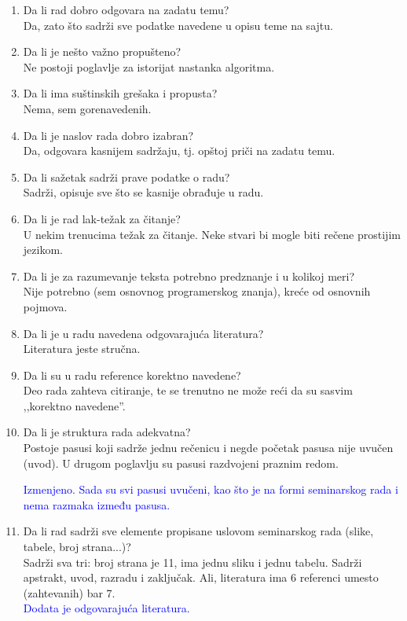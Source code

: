 \documentclass[a4paper]{report}
\newcommand{\odgovor}[1]{\textcolor{blue}{#1}}
\begin{document}
\begin{enumerate}
\item Da li rad dobro odgovara na zadatu temu?\\
Da, zato što sadrži sve podatke navedene u opisu teme na sajtu. 

\item Da li je nešto važno propušteno?\\
Ne postoji poglavlje za istorijat nastanka algoritma.

\item Da li ima suštinskih grešaka i propusta?\\
Nema, sem gorenavedenih.

\item Da li je naslov rada dobro izabran?\\
Da, odgovara kasnijem sadržaju, tj. opštoj priči na zadatu temu. 

\item Da li sažetak sadrži prave podatke o radu?\\
Sadrži, opisuje sve što se kasnije obrađuje u radu.

\item Da li je rad lak-težak za čitanje?\\
U nekim trenucima težak za čitanje. Neke stvari bi mogle biti rečene prostijim jezikom. 

\item Da li je za razumevanje teksta potrebno predznanje i u kolikoj meri?\\
Nije potrebno (sem osnovnog programerskog znanja), kreće od osnovnih pojmova. 

\item Da li je u radu navedena odgovarajuća literatura?\\
Literatura jeste stručna.

\item Da li su u radu reference korektno navedene?\\
Deo rada zahteva citiranje, te se trenutno ne može reći da su sasvim ,,korektno navedene''.

\item Da li je struktura rada adekvatna?\\
Postoje pasusi koji sadrže jednu rečenicu i negde početak pasusa nije uvučen (uvod). U drugom poglavlju su pasusi razdvojeni praznim redom.

\odgovor{Izmenjeno. Sada su svi pasusi uvučeni, kao što je na formi seminarskog rada i nema razmaka između pasusa.\\}
\item Da li rad sadrži sve elemente propisane uslovom seminarskog rada (slike, tabele, broj strana...)?\\
Sadrži sva tri: broj strana je 11, ima jednu sliku i jednu tabelu. Sadrži apstrakt, uvod, razradu i zaključak. Ali, literatura ima 6 referenci umesto (zahtevanih) bar 7.\\
\odgovor{Dodata je odgovarajuća literatura.\\}


\end{enumerate}
\end{document}
